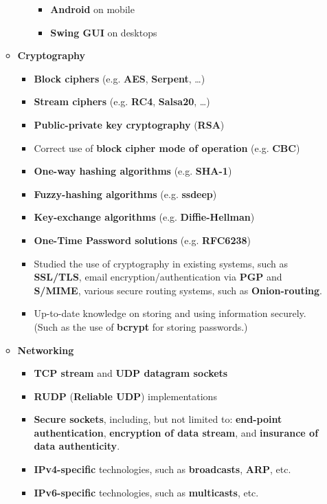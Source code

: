 \documentclass[11pt,a4paper]{article}
\begin{document}
\begin{itemize}
\begin{itemize}
\begin{itemize}
				\begin{itemize}
				\item	\textbf{Android} on mobile
				\item	\textbf{Swing GUI} on desktops
				\end{itemize}
			\end{itemize}
		\item	\textbf{Cryptography}
			\begin{itemize}
			\item	\textbf{Block ciphers} (e.g. \textbf{AES}, \textbf{Serpent}, \ldots)
			\item	\textbf{Stream ciphers} (e.g. \textbf{RC4}, \textbf{Salsa20}, \ldots)
			\item	\textbf{Public-private key cryptography} (\textbf{RSA})
			\item	Correct use of \textbf{block cipher mode of operation} (e.g. \textbf{CBC})
			\item	\textbf{One-way hashing algorithms} (e.g. \textbf{SHA-1})
			\item	\textbf{Fuzzy-hashing algorithms} (e.g. \textbf{ssdeep})
			\item	\textbf{Key-exchange algorithms} (e.g. \textbf{Diffie-Hellman})
			\item	\textbf{One-Time Password solutions} (e.g. \textbf{RFC6238})
			\item	Studied the use of cryptography in existing systems, such as \textbf{SSL/TLS}, email encryption/authentication via \textbf{PGP} and \textbf{S/MIME}, various secure routing systems, such as \textbf{Onion-routing}.
			\item	Up-to-date knowledge on storing and using information securely. (Such as the use of \textbf{bcrypt} for storing passwords.)
			\end{itemize}
		\item	\textbf{Networking}
			\begin{itemize}
			\item	\textbf{TCP stream} and \textbf{UDP datagram sockets}
			\item	\textbf{RUDP} (\textbf{Reliable UDP}) implementations
			\item	\textbf{Secure sockets}, including, but not limited to: \textbf{end-point authentication}, \textbf{encryption of data stream}, and \textbf{insurance of data authenticity}.
			\item	\textbf{IPv4-specific} technologies, such as \textbf{broadcasts}, \textbf{ARP}, etc.
			\item	\textbf{IPv6-specific} technologies, such as \textbf{multicasts}, etc.

\end{itemize}
\end{itemize}
\end{itemize}
\end{document}
